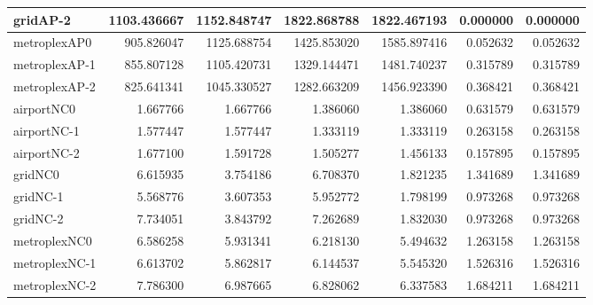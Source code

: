 \documentclass[../../../thesis.tex]{subfiles}
\begin{document}
\begin{longtable}{|l|r|r|r|r|r|r|}
gridAP-2 & 1103.436667 & 1152.848747 & 1822.868788 & 1822.467193 & 0.000000 & 0.000000 \\ \hline
metroplexAP0 & 905.826047 & 1125.688754 & 1425.853020 & 1585.897416 & 0.052632 & 0.052632 \\ \hline
metroplexAP-1 & 855.807128 & 1105.420731 & 1329.144471 & 1481.740237 & 0.315789 & 0.315789 \\ \hline
metroplexAP-2 & 825.641341 & 1045.330527 & 1282.663209 & 1456.923390 & 0.368421 & 0.368421 \\ \hline
airportNC0 & 1.667766 & 1.667766 & 1.386060 & 1.386060 & 0.631579 & 0.631579 \\ \hline
airportNC-1 & 1.577447 & 1.577447 & 1.333119 & 1.333119 & 0.263158 & 0.263158 \\ \hline
airportNC-2 & 1.677100 & 1.591728 & 1.505277 & 1.456133 & 0.157895 & 0.157895 \\ \hline
gridNC0 & 6.615935 & 3.754186 & 6.708370 & 1.821235 & 1.341689 & 1.341689 \\ \hline
gridNC-1 & 5.568776 & 3.607353 & 5.952772 & 1.798199 & 0.973268 & 0.973268 \\ \hline
gridNC-2 & 7.734051 & 3.843792 & 7.262689 & 1.832030 & 0.973268 & 0.973268 \\ \hline
metroplexNC0 & 6.586258 & 5.931341 & 6.218130 & 5.494632 & 1.263158 & 1.263158 \\ \hline
metroplexNC-1 & 6.613702 & 5.862817 & 6.144537 & 5.545320 & 1.526316 & 1.526316 \\ \hline
metroplexNC-2 & 7.786300 & 6.987665 & 6.828062 & 6.337583 & 1.684211 & 1.684211 \\ \hline
\end{longtable}
\end{document}
